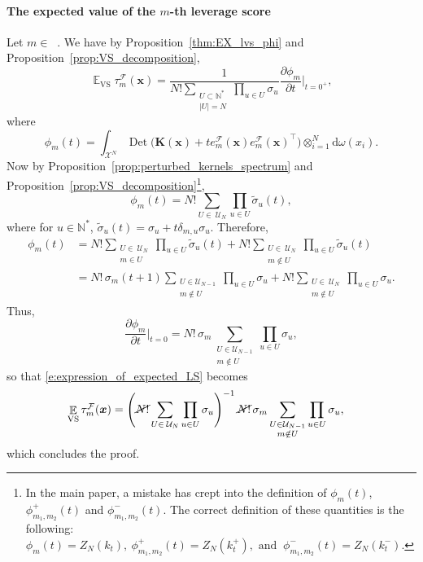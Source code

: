 \documentclass[twoside,11pt]{book}
\numberwithin{theorem}{chapter}
\numberwithin{definition}{chapter}
\numberwithin{proposition}{chapter}
\numberwithin{corollary}{chapter}
\numberwithin{example}{chapter}
\numberwithin{lemma}{chapter}
\DeclareMathOperator{\Det}{Det}
\DeclareMathOperator{\VS}{\mathrm{VS}}
\DeclareMathOperator{\Tran}{\intercal}
\DeclareMathOperator{\EX}{\mathbb{E}}
\DeclareMathOperator{\F}{\mathcal{F}}
\DeclareMathOperator{\Ns}{\mathbb{N}^{*}}
\def\UN{\:\mathcal{U}_N}
\begin{document}
\paragraph{The expected value of the $m$-th leverage score}
Let $m \in \Ns$. We have by Proposition~\ref{thm:EX_lvs_phi} and Proposition~\ref{prop:VS_decomposition},
\begin{equation}
\EX_{\VS} \tau_{m}^{\F}(\bm{x})  = \frac{1}{N!\sum\limits_{\substack{U \subset \mathbb{N}^{*}\\ |U| = N}} \prod\limits_{u \in U}\sigma_{u}}  \frac{\partial \phi_{m}}{ \partial t }|_{t = 0^{+}},
\label{e:expression_of_expected_LS}\end{equation}
where
\begin{equation}
\phi_{m}(t) = \int_{\mathcal{X}^{N}} \Det \bigg(\bm{K}(\bm{x})+t e_{m}^{\mathcal{F}}(\bm{x})e_{m}^{\mathcal{F}}(\bm{x})^{\Tran} \bigg) \otimes_{i =1}^{N} \mathrm{d}\omega(x_{i}).
\end{equation}
Now by Proposition~\ref{prop:perturbed_kernels_spectrum} and Proposition~\ref{prop:VS_decomposition}\footnote{In the main paper, a mistake has crept into the definition of $\phi_{m}(t)$, $\phi_{m_{1},m_{2}}^{+}(t)$ and $\phi_{m_{1},m_{2}}^{-}(t)$. The correct definition of these quantities is the following: $
\phi_{m}(t) = Z_{N}(k_{t}) , \: \phi_{m_{1},m_{2}}^{+}(t) = Z_{N}(k_{t}^{+}),  \text{ and }\: \phi_{m_{1},m_{2}}^{-}(t) = Z_{N}(k_{t}^{-}). $},
\begin{equation}
\phi_{m}(t) = N! \sum\limits_{U\in\UN} \prod\limits_{u \in U} \tilde{\sigma}_{u}(t),
\end{equation}
where for $u \in \mathbb{N}^{*}$, $\tilde{\sigma}_{u}(t) = \sigma_{u} + t\delta_{m,u}\sigma_{u}$.
Therefore,
\begin{align}
\phi_{m}(t) & = N!\sum\limits_{\substack{U \in\UN \\ m \in U}} \prod\limits_{u \in U} \tilde{\sigma}_{u}(t) + N!\sum\limits_{\substack{U \in\UN \\ m \notin U}} \prod\limits_{u \in U} \tilde{\sigma}_{u}(t) \\
& = N!\,\sigma_{m}(t+1)\sum\limits_{\substack{U\in \mathcal{U}_{N-1}\\ m \notin U}} \prod\limits_{u \in U} \sigma_{u} + N!\sum\limits_{\substack{U \in\UN \\ m \notin U}} \prod\limits_{u \in U} \sigma_{u}.
\end{align}
Thus,  
\begin{equation}
\frac{\partial \phi_{m}}{\partial t}|_{t = 0} = N!\,\sigma_{m}\sum\limits_{\substack{U\in \mathcal{U}_{N-1}\\ m \notin U}} \prod\limits_{u \in U} \sigma_{u},
\end{equation}
so that \eqref{e:expression_of_expected_LS} becomes
\begin{align}
\EX_{\VS} \tau_{m}^{\F}(\bm{x}) & = \left(\cancel{N!}\sum\limits_{U\in\UN}\prod\limits_{u \in U}\sigma_{u} \right)^{-1} \cancel{N!}\,\sigma_{m}\sum\limits_{\substack{U\in \mathcal{U}_{N-1}\\ m \notin U}} \prod\limits_{u \in U} \sigma_{u},
\end{align}
which concludes the proof.
\end{document}
